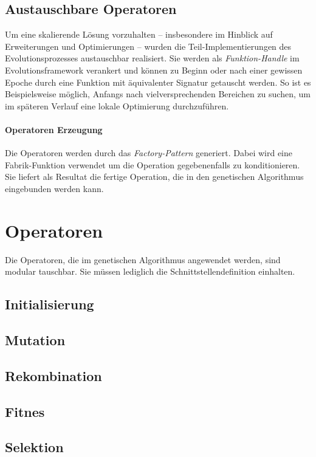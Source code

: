 \documentclass[12pt,a4paper]{scrartcl}
\begin{document}
\subsection{Austauschbare Operatoren}
Um eine skalierende Lösung vorzuhalten -- insbesondere im Hinblick auf Erweiterungen und Optimierungen -- wurden die Teil-Implementierungen des Evolutionsprozesses austauschbar realisiert. Sie werden als \emph{Funktion-Handle} im Evolutionsframework verankert und können zu Beginn oder nach einer gewissen Epoche durch eine Funktion mit äquivalenter Signatur getauscht werden. So ist es Beispielsweise möglich, Anfangs nach vielversprechenden Bereichen zu suchen, um im späteren Verlauf eine lokale Optimierung durchzuführen.

\paragraph{Operatoren Erzeugung} Die Operatoren werden durch das \emph{Factory-Pattern} generiert. Dabei wird eine Fabrik-Funktion verwendet um die Operation gegebenenfalls zu konditionieren. Sie liefert als Resultat die fertige Operation, die in den genetischen Algorithmus eingebunden werden kann.

\section{Operatoren}
Die Operatoren, die im genetischen Algorithmus angewendet werden, sind modular tauschbar. Sie müssen lediglich die Schnittstellendefinition einhalten.
\subsection{Initialisierung}

\subsection{Mutation}

\subsection{Rekombination}

\subsection{Fitnes}

\subsection{Selektion}
\end{document}

